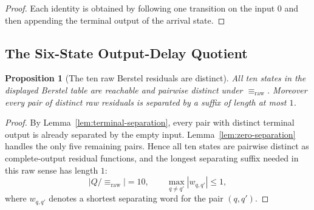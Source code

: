 \documentclass[11pt,letterpaper]{article}
\numberwithin{equation}{section}
\theoremstyle{plain}
\newtheorem{proposition}[theorem]{Proposition}
\theoremstyle{definition}
\theoremstyle{remark}
\begin{document}
\begin{proof}
Each identity is obtained by following one transition on the input $0$ and
then appending the terminal output of the arrival state.
\end{proof}

\subsection{The Six-State Output-Delay Quotient}

\begin{proposition}[The ten raw Berstel residuals are distinct]\label{prop:berstel-raw-residuals}
All ten states in the displayed Berstel table are reachable and pairwise
distinct under $\equiv_{\mathrm{raw}}$.  Moreover every pair of distinct raw
residuals is separated by a suffix of length at most $1$.
\end{proposition}

\begin{proof}
By Lemma~\ref{lem:terminal-separation}, every pair with distinct terminal
output is already separated by the empty input.  Lemma~\ref{lem:zero-separation}
handles the only five remaining pairs.  Hence all ten states are pairwise
distinct as complete-output residual functions, and the longest separating
suffix needed in this raw sense has length $1$:
\[
\boxed{|Q/\!\equiv_{\mathrm{raw}}|=10,\qquad
\max_{q\neq q'}|w_{q,q'}|\le 1,}
\]
where $w_{q,q'}$ denotes a shortest separating word for the pair $(q,q')$.
\end{proof}
\end{document}
